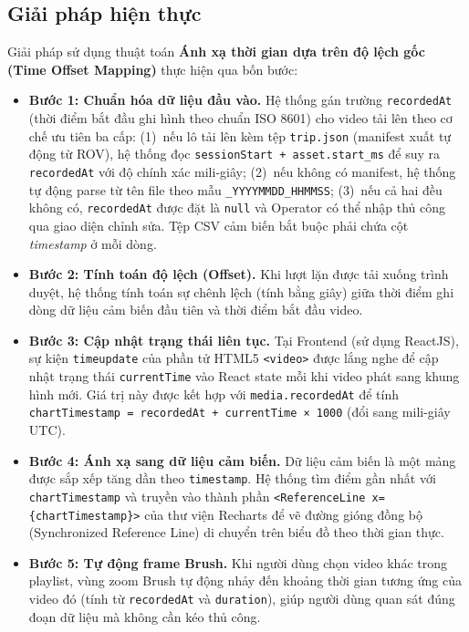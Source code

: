 \documentclass[../DoAn.tex]{subfiles}
\begin{document}
\subsection{Giải pháp hiện thực}

Giải pháp sử dụng thuật toán \textbf{Ánh xạ thời gian dựa trên độ lệch gốc (Time Offset Mapping)} thực hiện qua bốn bước:

\begin{itemize}[leftmargin=*, topsep=4pt, itemsep=4pt]
    \item \textbf{Bước 1: Chuẩn hóa dữ liệu đầu vào.} Hệ thống gán trường \texttt{recordedAt} (thời điểm bắt đầu ghi hình theo chuẩn ISO 8601) cho video tải lên theo cơ chế ưu tiên ba cấp: (1)~nếu lô tải lên kèm tệp \texttt{trip.json} (manifest xuất tự động từ ROV), hệ thống đọc \texttt{sessionStart +\allowbreak{} asset.start\_ms} để suy ra \texttt{recordedAt} với độ chính xác mili-giây; (2)~nếu không có manifest, hệ thống tự động parse từ tên file theo mẫu \texttt{\_YYYYMMDD\_HHMMSS}; (3)~nếu cả hai đều không có, \texttt{recordedAt} được đặt là \texttt{null} và Operator có thể nhập thủ công qua giao diện chỉnh sửa. Tệp CSV cảm biến bắt buộc phải chứa cột \textit{timestamp} ở mỗi dòng.
    \item \textbf{Bước 2: Tính toán độ lệch (Offset).} Khi lượt lặn được tải xuống trình duyệt, hệ thống tính toán sự chênh lệch (tính bằng giây) giữa thời điểm ghi dòng dữ liệu cảm biến đầu tiên và thời điểm bắt đầu video.
    \item \textbf{Bước 3: Cập nhật trạng thái liên tục.} Tại Frontend (sử dụng ReactJS), sự kiện \texttt{timeupdate} của phần tử HTML5 \texttt{<video>} được lắng nghe để cập nhật trạng thái \texttt{currentTime} vào React state mỗi khi video phát sang khung hình mới. Giá trị này được kết hợp với \texttt{media.recordedAt} để tính \texttt{chartTimestamp =\allowbreak{} recordedAt + currentTime × 1000} (đổi sang mili-giây UTC).
    \item \textbf{Bước 4: Ánh xạ sang dữ liệu cảm biến.} Dữ liệu cảm biến là một mảng được sắp xếp tăng dần theo \texttt{timestamp}. Hệ thống tìm điểm gần nhất với \texttt{chartTimestamp} và truyền vào thành phần \texttt{<ReferenceLine\allowbreak{} x=\{chartTimestamp\}>} của thư viện Recharts để vẽ đường gióng đồng bộ (Synchronized Reference Line) di chuyển trên biểu đồ theo thời gian thực.
    \item \textbf{Bước 5: Tự động frame Brush.} Khi người dùng chọn video khác trong playlist, vùng zoom Brush tự động nhảy đến khoảng thời gian tương ứng của video đó (tính từ \texttt{recordedAt} và \texttt{duration}), giúp người dùng quan sát đúng đoạn dữ liệu mà không cần kéo thủ công.
\end{itemize}
\end{document}
